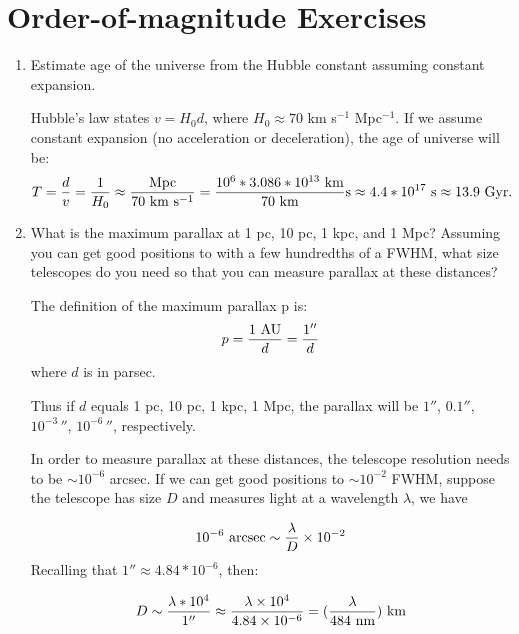 \section{Order-of-magnitude Exercises}

\begin{enumerate} 
\item Estimate age of the universe from the Hubble constant assuming
    constant expansion.

\begin{answer}
Hubble's law states $v = H_0 d$, where $H_0\approx 70$ km s$^{-1}$
Mpc$^{-1}$. If we assume constant expansion (no acceleration or
deceleration), the age of universe will be:
\begin{equation}
T = \frac{d}{v}=\frac{1}{H_0}\approx
\frac{{\rm Mpc}}{70 {\rm ~km} {\rm ~s}^{-1}} =
\frac{10^6*3.086*10^{13} {\rm ~km}}{70 {\rm ~km}} {\rm s}\approx
4.4*10^{17} {\rm ~s}\approx 13.9 {\rm ~Gyr}.
\end{equation}
\end{answer}

\item What is the maximum parallax at 1 pc, 10 pc, 1 kpc, and 1 Mpc?
    Assuming you can get good positions to with a few hundredths of a
    FWHM, what size telescopes do you need so that you can measure
    parallax at these distances?

\begin{answer}
The definition of the maximum parallax p is:
\begin{equation}
    p = \frac{1 {\rm ~AU}}{d} = \frac{1''}{d}
\end{equation}
where $d$ is in parsec.

Thus if $d$ equals 1 pc, 10 pc, 1 kpc, 1 Mpc, the parallax will be
$1''$, $0.1''$, $10^{-3}\,''$, $10^{-6}\,''$, respectively. 

In order to measure parallax at these distances, the telescope
resolution needs to be $\sim 10^{-6}$ arcsec. If we can get good
positions to $\sim 10^{-2}$ FWHM, suppose the telescope has size $D$
and measures light at a wavelength $\lambda$, we have

\begin{equation}
    10^{-6} {\rm ~arcsec} \sim \frac{\lambda}{D} \times 10^{-2}
\end{equation}
Recalling that $1'' \approx 4.84*10^{-6}$, then:

\begin{equation}
    D \sim \frac{\lambda * 10^4}{1''}\approx \frac{\lambda \times
    10^4}{4.84\times 10^{-6}}= (\frac{\lambda}{484 {\rm ~nm}}){\rm ~km}
\end{equation}


\end{answer}
\end{enumerate}
